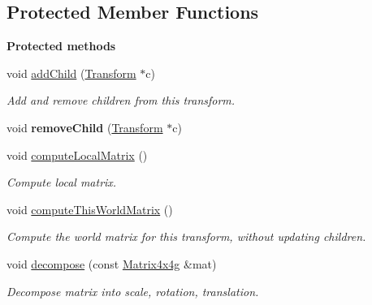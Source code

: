 \subsection*{Protected Member Functions}
\begin{Indent}\textbf{ Protected methods}\par
\begin{DoxyCompactItemize}
\item 
\mbox{\label{classrev_1_1_transform_aed118acd97b6507dc323e1b3e53122e9}} 
void \mbox{\hyperlink{classrev_1_1_transform_aed118acd97b6507dc323e1b3e53122e9}{add\+Child}} (\mbox{\hyperlink{classrev_1_1_transform}{Transform}} $\ast$c)
\begin{DoxyCompactList}\small\item\em Add and remove children from this transform. \end{DoxyCompactList}\item 
\mbox{\label{classrev_1_1_transform_aa228447a4a469d5ae743521d98ac36ec}} 
void {\bfseries remove\+Child} (\mbox{\hyperlink{classrev_1_1_transform}{Transform}} $\ast$c)
\item 
\mbox{\label{classrev_1_1_transform_adc90d777796fc7ea57f62b160844161a}} 
void \mbox{\hyperlink{classrev_1_1_transform_adc90d777796fc7ea57f62b160844161a}{compute\+Local\+Matrix}} ()
\begin{DoxyCompactList}\small\item\em Compute local matrix. \end{DoxyCompactList}\item 
\mbox{\label{classrev_1_1_transform_af868d0079b3bba70d4030eda58b97c2a}} 
void \mbox{\hyperlink{classrev_1_1_transform_af868d0079b3bba70d4030eda58b97c2a}{compute\+This\+World\+Matrix}} ()
\begin{DoxyCompactList}\small\item\em Compute the world matrix for this transform, without updating children. \end{DoxyCompactList}\item 
\mbox{\label{classrev_1_1_transform_a10b69acdc2ac20938dd53d1ba93e5fcd}} 
void \mbox{\hyperlink{classrev_1_1_transform_a10b69acdc2ac20938dd53d1ba93e5fcd}{decompose}} (const \mbox{\hyperlink{classrev_1_1_square_matrix}{Matrix4x4g}} \&mat)
\begin{DoxyCompactList}\small\item\em Decompose matrix into scale, rotation, translation. \end{DoxyCompactList}\end{DoxyCompactItemize}
\end{Indent}
